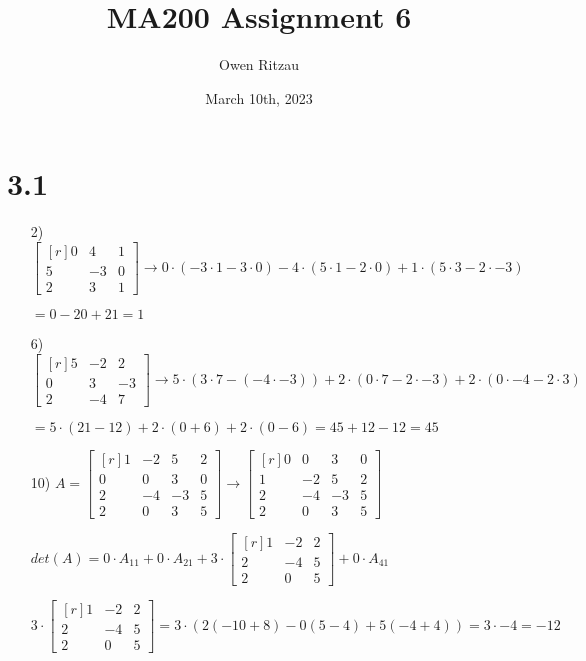 \documentclass{article}
\title{MA200 Assignment 6}
\author{Owen Ritzau}
\date{March 10th, 2023}
\begin{document}
\maketitle

\section * {3.1}
  \begin{enumerate}
    \item[2)]
      $\begin{bmatrix*}[r]
      0 & 4 & 1\\
      5 & -3 & 0\\
      2 & 3 & 1
      \end{bmatrix*} \rightarrow 0\cdot(-3\cdot1-3\cdot0)-
      4\cdot(5\cdot1-2\cdot0)+1\cdot(5\cdot3-2\cdot-3)$ 

      $=0-20+21=1$ 
    \item[6)]
      $\begin{bmatrix*}[r]
      5 & -2 &2\\
      0 & 3 & -3\\
      2 & -4 & 7
      \end{bmatrix*} \rightarrow 5\cdot(3\cdot7-(-4\cdot-3))+
      2\cdot(0\cdot7-2\cdot-3)+2\cdot(0\cdot-4-2\cdot3)$

      $=5\cdot(21-12)+2\cdot(0+6)+2\cdot(0-6)=45+12-12=45$

    \item[10)]
      $A = \begin{bmatrix*}[r]
      1&-2&5&2\\
      0&0&3&0\\
      2&-4&-3&5\\
      2&0&3&5
      \end{bmatrix*}\rightarrow
      \begin{bmatrix*}[r]
      0&0&3&0\\
      1&-2&5&2\\
      2&-4&-3&5\\
      2&0&3&5
      \end{bmatrix*}$

      $det(A) = 0\cdot A_{11}+0\cdot A_{21}+
      3\cdot 
      \begin{bmatrix*}[r]
      1&-2&2\\
      2&-4&5\\
      2&0&5
      \end{bmatrix*}
      +0\cdot A_{41}$
      
      $3\cdot
      \begin{bmatrix*}[r]
      1&-2&2\\
      2&-4&5\\
      2&0&5
      \end{bmatrix*}
      = 3\cdot(2(-10+8)-0(5-4)+5(-4+4))=3\cdot-4=-12$


\end{enumerate}
\end{document}
